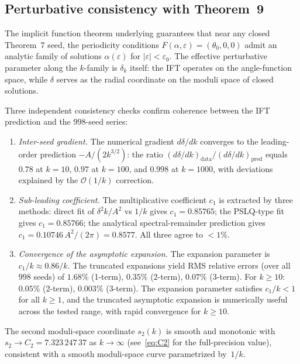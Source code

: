 \documentclass[11pt,a4paper]{article}
\theoremstyle{plain}
\theoremstyle{definition}
\theoremstyle{remark}
\newcommand{\Oo}{\mathcal{O}}
\begin{document}
\subsection{Perturbative consistency with Theorem~9}%
\label{sec:theorem9-consistency}

The implicit function theorem underlying
{\cite[Theorem~9]{BHS25}} guarantees that near any closed
Theorem~7 seed, the periodicity conditions
$F(\alpha,\varepsilon)=(\theta_0,0,0)$ admit an analytic family of
solutions $\alpha(\varepsilon)$ for $|\varepsilon|<\varepsilon_0$.
The effective perturbative parameter along the $k$-family is
$\delta_k$ itself: the IFT operates on the angle-function space,
while $\delta$ serves as the radial coordinate on the moduli
space of closed solutions.

Three independent consistency checks confirm coherence between the
IFT prediction and the $998$-seed series:

\begin{enumerate}[nosep,label=(\roman*)]
\item \emph{Inter-seed gradient.}
  The numerical gradient $d\delta/dk$ converges to the leading-order
  prediction $-A/(2k^{3/2})$: the ratio
  $(d\delta/dk)_{\mathrm{data}} / (d\delta/dk)_{\mathrm{pred}}$
  equals $0.78$ at $k=10$, $0.97$ at $k=100$, and $0.998$ at
  $k=1000$, with deviations explained by the $\Oo(1/k)$ correction.

\item \emph{Sub-leading coefficient.}
  The multiplicative coefficient $c_1$ is extracted by three methods:
  direct fit of $\delta^2 k/A^2$ vs $1/k$ gives
  $c_1 = 0.85765$;
  the PSLQ-type fit gives $c_1 = 0.85766$;
  the analytical spectral-remainder prediction gives
  $c_1 = 0.10746\,A^2/(2\pi) = 0.8577$.
  All three agree to $<1\%$.

\item \emph{Convergence of the asymptotic expansion.}
  The expansion parameter is $c_1/k \approx 0.86/k$.
  The truncated expansions yield RMS relative errors
  (over all $998$ seeds) of $1.68\%$ (1-term),
  $0.35\%$ (2-term), $0.07\%$ (3-term).
  For $k \geq 10$: $0.05\%$ (2-term), $0.003\%$ (3-term).
  The expansion parameter satisfies $c_1/k < 1$ for all
  $k \geq 1$, and the truncated asymptotic expansion is numerically
  useful across the tested range, with rapid convergence for $k \geq 10$.
\end{enumerate}

\noindent
The second moduli-space coordinate $s_2(k)$ is smooth and monotonic
with $s_2 \to C_2 = 7.323\,247\,37$ as $k\to\infty$
(see~\eqref{eq:C2} for the full-precision value),
consistent with a smooth
moduli-space curve parametrized by~$1/k$.
\end{document}

